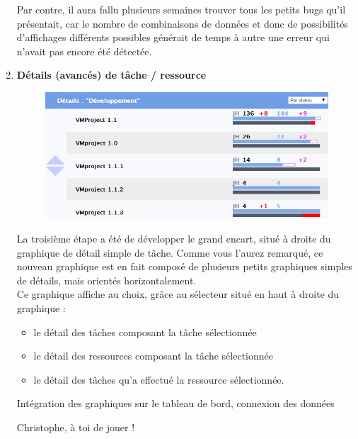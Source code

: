 \documentclass[12pt]{report}
\begin{document}
\begin{enumerate}
Par contre, il aura fallu plusieurs semaines trouver tous les petits bugs qu'il présentait, car le nombre de combinaisons de données et donc de possibilités d'affichages différents possibles générait de temps à autre une erreur qui n'avait pas encore été détectée.\\


\item \textbf{Détails (avancés) de tâche / ressource}\\

\begin{figure}[H]
	\centering
	\includegraphics[width=1\textwidth]{pictures/realisations/detailsTache.jpg}
	\caption{}
	\label{20}
\end{figure}

La troisième étape a été de développer le grand encart, situé à droite du graphique de détail simple de tâche. Comme vous l'aurez remarqué, ce nouveau graphique est en fait composé de plusieurs petits graphiques simples de détails, mais orientés horizontalement.\\

Ce graphique affiche au choix, grâce au sélecteur situé en haut à droite du graphique :\\

\begin{itemize}
\item le détail des tâches composant la tâche sélectionnée
\item le détail des ressources composant la tâche sélectionnée
\item le détail des tâches qu'a effectué la ressource sélectionnée.\\
\end{itemize}


Intégration des graphiques sur le tableau de bord, connexion des données

Christophe, à toi de jouer !




\end{enumerate}
\end{document}

